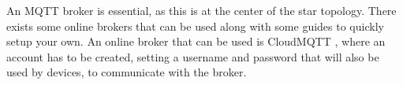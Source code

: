 An MQTT broker is essential, as this is at the center of the star topology. There exists some online brokers that can be used along with some guides to quickly setup your own. An online broker that can be used is CloudMQTT \cite{CloudMQTT}, where an account has to be created, setting a username and password that will also be used by devices, to communicate with the broker. 

